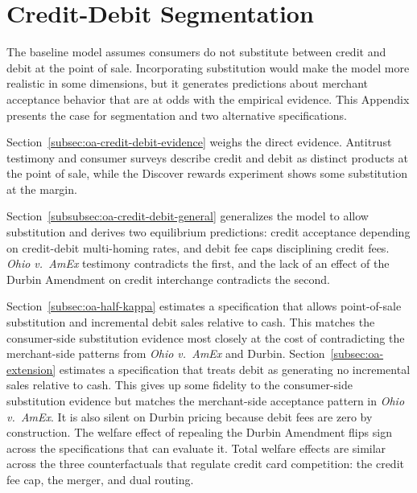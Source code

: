 \documentclass[main.tex]{subfiles}
\begin{document}
\section{Credit-Debit Segmentation}
\label{sec:oa-credit-debit}

The baseline model assumes consumers do not substitute between credit and debit at the point of sale.
Incorporating substitution would make the model more realistic in some dimensions, but it generates predictions about merchant acceptance behavior that are at odds with the empirical evidence. 
This Appendix presents the case for segmentation and two alternative specifications.

Section~\ref{subsec:oa-credit-debit-evidence} weighs the direct evidence.
Antitrust testimony and consumer surveys describe credit and debit as distinct products at the point of sale, while the Discover rewards experiment shows some substitution at the margin.

Section~\ref{subsubsec:oa-credit-debit-general} generalizes the model to allow substitution and derives two equilibrium predictions: credit acceptance depending on credit-debit multi-homing rates, and debit fee caps disciplining credit fees.
\emph{Ohio v.\ AmEx} testimony contradicts the first, and the lack of an effect of the Durbin Amendment on credit interchange contradicts the second.

Section~\ref{subsec:oa-half-kappa} estimates a specification that allows point-of-sale substitution and incremental debit sales relative to cash.
This matches the consumer-side substitution evidence most closely at the cost of contradicting the merchant-side patterns from \emph{Ohio v.\ AmEx} and Durbin.
Section~\ref{subsec:oa-extension} estimates a specification that treats debit as generating no incremental sales relative to cash.
This gives up some fidelity to the consumer-side substitution evidence but matches the merchant-side acceptance pattern in \emph{Ohio v.\ AmEx}. It is also silent on Durbin pricing because debit fees are zero by construction.
The welfare effect of repealing the Durbin Amendment flips sign across the specifications that can evaluate it.
Total welfare effects are similar across the three counterfactuals that regulate credit card competition: the credit fee cap, the merger, and dual routing.
\end{document}
